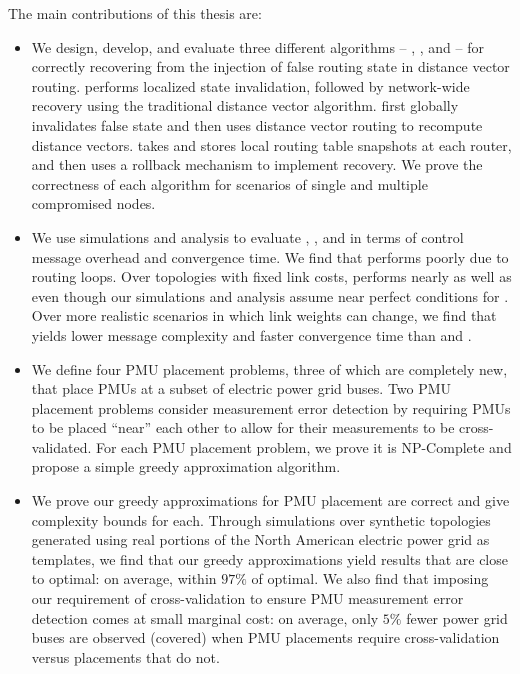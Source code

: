 The main contributions of this thesis are:
\begin{itemize}

	\item  We design, develop, and evaluate three different algorithms -- \seconds, \purges, and \cpr -- for correctly recovering from the injection of false routing state in distance vector routing.
		\second performs localized state invalidation, followed by network-wide recovery using the traditional distance vector algorithm. 
		\purge first globally invalidates false state and then uses distance vector routing to recompute distance vectors.  \cpr takes and stores local routing table snapshots at each router, and then uses 
		a rollback mechanism to implement recovery. We prove the correctness of each algorithm for scenarios of single and multiple compromised nodes.

	

	\item We use simulations and analysis to evaluate \seconds, \purges, and \cpr in terms of control message overhead and convergence time. We find that \second performs poorly due to routing loops.  
	Over topologies with fixed link costs, \purge performs nearly as well as \cpr even though our simulations and analysis assume near perfect conditions for \cprs.
	Over more realistic scenarios in which link weights can change, we find that \purge yields lower message complexity and faster convergence time than \cpr and \seconds. 


	\item We define four PMU placement problems, three of which are completely new, that place PMUs at a subset of electric power grid buses. 
		Two PMU placement problems consider measurement error detection by requiring PMUs to be placed ``near'' each other to allow for their measurements to be cross-validated. 
		For each PMU placement problem, we prove it is NP-Complete and propose a simple greedy approximation algorithm. 

	
	\item We prove our greedy approximations for PMU placement are correct and give complexity bounds for each.  Through simulations over synthetic topologies generated using real portions of the 
		North American electric power grid as templates, we find that our greedy approximations yield results that are close to optimal: on average, within $97\%$ of optimal.  We also find that 
		imposing our requirement of cross-validation to ensure PMU measurement error detection comes at small marginal cost: on average, only $5\%$ fewer power grid buses are observed (covered) 
		when PMU placements require cross-validation versus placements that do not. 
	


\end{itemize}
